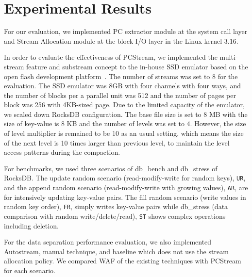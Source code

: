 \section{Experimental Results}
For our evaluation, we implemented PC extractor module at the 
system call layer 
and Stream Allocation module at the block I/O layer in the Linux kernel 3.16.

In order to evaluate the effectiveness of {\sf PCStream},
we implemented the multi-stream feature and substream concept
to the in-house SSD emulator
based on the open flash development platform~\cite{AMF}.
The number of streams was set to 8 for the evaluation.
The SSD emulator was 8GB with four channels with four ways, and 
the number of blocks per a parallel unit was 512 and
the number of pages per block was 256 with 4KB-sized page.
Due to the limited capacity of the emulator, 
we scaled down RocksDB configuration.
The base file size is set to 8 MB
with the size of key-value is 8 KB and the number of levels was set to 4.
However, the size of level multiplier is remained to be 10 as an usual setting,
which means the size of the next level is 10 times larger than previous level,
to maintain the level access patterns during the compaction.

For benchmarks, we used three scenarios of db\_bench and db\_stress of RocksDB.
The update random scenario (read-modify-write for random keys), {\tt UR}, and 
the append random scenario (read-modify-write with growing values), {\tt AR}, are
for intensively updating key-value pairs.
The fill random scenario (write values in random key order), {\tt FR}, simply writes key-value pairs
while db\_stress (data comparison with random write/delete/read), {\tt ST} shows complex 
operations including deletion.

For the data separation performance evaluation, 
we also implemented Autostream, manual technique, and
baseline which does not use the stream allocation policy.
We compared WAF of the existing techniques with {\sf PCStream}
for each scenario.




